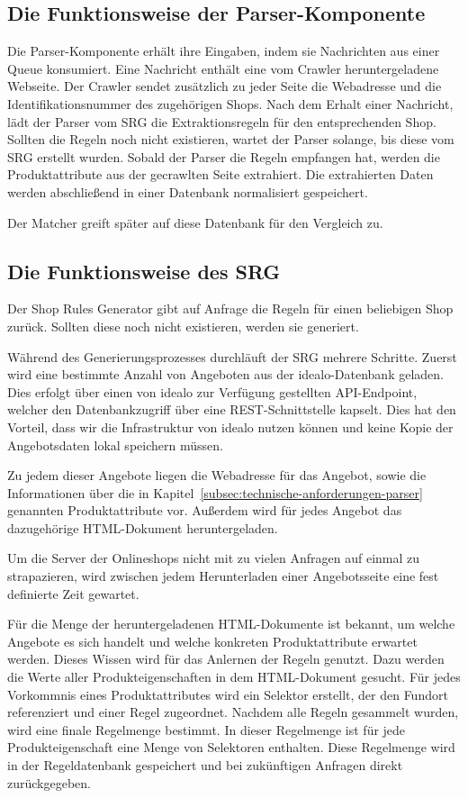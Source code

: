 \subsection{Die Funktionsweise der Parser-Komponente}
\label{subsec:funktionsweise-parser}

Die Parser-Komponente erhält ihre Eingaben, indem sie Nachrichten aus einer Queue konsumiert.
Eine Nachricht enthält eine vom Crawler heruntergeladene Webseite.
Der Crawler sendet zusätzlich zu jeder Seite die Webadresse und die Identifikationsnummer des zugehörigen Shops.
Nach dem Erhalt einer Nachricht, lädt der Parser vom SRG die Extraktionsregeln für den entsprechenden Shop.
Sollten die Regeln noch nicht existieren, wartet der Parser solange, bis diese vom SRG erstellt wurden.
Sobald der Parser die Regeln empfangen hat, werden die Produktattribute aus der gecrawlten Seite extrahiert.
Die extrahierten Daten werden abschließend in einer Datenbank normalisiert gespeichert.

Der Matcher greift später auf diese Datenbank für den Vergleich zu.

\subsection{Die Funktionsweise des SRG}
\label{subsec:funktionsweise-srg}

Der Shop Rules Generator gibt auf Anfrage die Regeln für einen beliebigen Shop zurück.
Sollten diese noch nicht existieren, werden sie generiert.

Während des Generierungsprozesses durchläuft der SRG mehrere Schritte.
Zuerst wird eine bestimmte Anzahl von Angeboten aus der idealo-Datenbank geladen.
Dies erfolgt über einen von idealo zur Verfügung gestellten API-Endpoint, welcher den Datenbankzugriff über eine
REST-Schnittstelle kapselt.
Dies hat den Vorteil, dass wir die Infrastruktur von idealo nutzen können und keine Kopie der Angebotsdaten
lokal speichern müssen.

Zu jedem dieser Angebote liegen die Webadresse für das Angebot, sowie die  Informationen über die in
Kapitel~\ref{subsec:technische-anforderungen-parser} genannten Produktattribute vor.
Außerdem wird für jedes Angebot das dazugehörige HTML-Dokument heruntergeladen.

Um die Server der Onlineshops nicht mit zu vielen Anfragen auf einmal zu strapazieren, wird zwischen jedem
Herunterladen einer Angebotsseite eine fest definierte Zeit gewartet.

Für die Menge der heruntergeladenen HTML-Dokumente ist bekannt, um welche Angebote es sich handelt und welche
konkreten Produktattribute erwartet werden.
Dieses Wissen wird für das Anlernen der Regeln genutzt.
Dazu werden die Werte aller Produkteigenschaften in dem HTML-Dokument gesucht.
Für jedes Vorkommnis eines Produktattributes wird ein Selektor erstellt, der den Fundort referenziert und einer Regel
zugeordnet.
Nachdem alle Regeln gesammelt wurden, wird eine finale Regelmenge bestimmt.
In dieser Regelmenge ist für jede Produkteigenschaft eine Menge von Selektoren enthalten.
Diese Regelmenge wird in der Regeldatenbank gespeichert und bei zukünftigen Anfragen direkt zurückgegeben.

